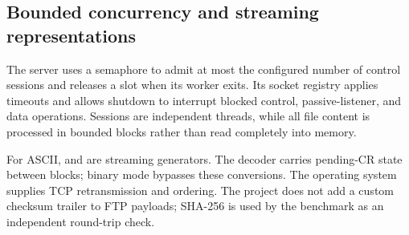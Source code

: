 \subsection{Bounded concurrency and streaming representations}
The server uses a semaphore to admit at most the configured number of control sessions and releases a slot when its worker exits. Its socket registry applies timeouts and allows shutdown to interrupt blocked control, passive-listener, and data operations. Sessions are independent threads, while all file content is processed in bounded blocks rather than read completely into memory.



For ASCII,  and  are streaming generators. The decoder carries pending-CR state between blocks; binary mode bypasses these conversions. The operating system supplies TCP retransmission and ordering. The project does not add a custom checksum trailer to FTP payloads; SHA-256 is used by the benchmark as an independent round-trip check.
\endgroup
